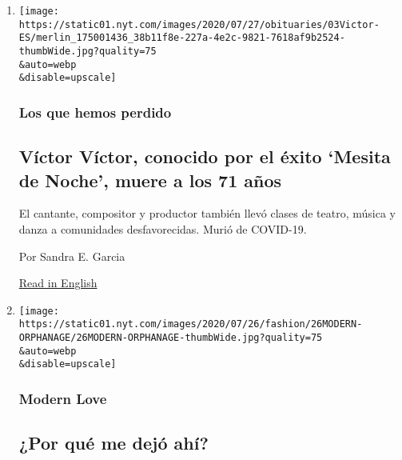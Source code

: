 \begin{enumerate}
\def\labelenumi{\arabic{enumi}.}
\item
  \href{/es/2020/08/03/espanol/cultura/victor-victor-murio-coronavirus.html}{}

  \texttt{[image: https://static01.nyt.com/images/2020/07/27/obituaries/03Victor-ES/merlin\_175001436\_38b11f8e-227a-4e2c-9821-7618af9b2524-thumbWide.jpg?quality=75\\\&auto=webp\\\&disable=upscale]}

  \hypertarget{los-que-hemos-perdido}{%
  \subsubsection{Los que hemos perdido}\label{los-que-hemos-perdido}}

  \hypertarget{vuxedctor-vuxedctor-conocido-por-el-uxe9xito-mesita-de-noche-muere-a-los-71-auxf1os}{%
  \subsection{Víctor Víctor, conocido por el éxito `Mesita de Noche',
  muere a los 71
  años}\label{vuxedctor-vuxedctor-conocido-por-el-uxe9xito-mesita-de-noche-muere-a-los-71-auxf1os}}

  El cantante, compositor y productor también llevó clases de teatro,
  música y danza a comunidades desfavorecidas. Murió de COVID-19.

  Por Sandra E. Garcia

  \href{https://www.nytimes.com/2020/08/01/obituaries/victor-victor-dead-coronavirus.html}{Read
  in English}
\item
  \href{/es/2020/08/02/espanol/estilos-de-vida/adopcion-orfanato.html}{}

  \texttt{[image: https://static01.nyt.com/images/2020/07/26/fashion/26MODERN-ORPHANAGE/26MODERN-ORPHANAGE-thumbWide.jpg?quality=75\\\&auto=webp\\\&disable=upscale]}

  \hypertarget{modern-love}{%
  \subsubsection{Modern Love}\label{modern-love}}

  \hypertarget{por-quuxe9-me-dejuxf3-ahuxed}{%
  \subsection{¿Por qué me dejó
  ahí?}\label{por-quuxe9-me-dejuxf3-ahuxed}}


\end{enumerate}
